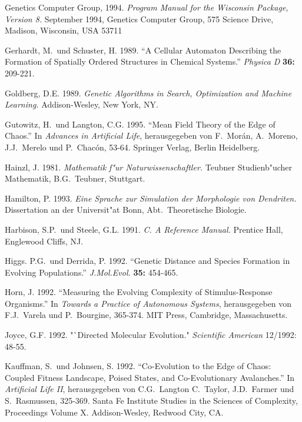 \begin{thebibliography}{99}
Genetics Computer Group, 1994. \textsl{Program Manual for the Wisconsin Package,
            Version 8.} September 1994, Genetics Computer Group,
             575 Science Drive, Madison, Wisconsin, USA  53711

Gerhardt, M.\ und Schuster, H. 1989. "`A Cellular Automaton Describing the Formation of Spatially
Ordered Structures in Chemical Systems."' \textsl{Physica D} \textbf{36:} 209-221.

Goldberg, D.E. 1989. \textsl{Genetic Algorithms in Search, Optimization and Machine Learning.}
Addison-Wesley, New York, NY.

Gutowitz, H.\ und Langton, C.G. 1995. "`Mean Field Theory of the Edge of Chaos."'
In \textsl{Advances in Artificial Life}, herausgegeben von F.\ Mor{\'a}n, A.\ Moreno,
J.J.\ Merelo und P.\ Chac{\'o}n, 53-64. Springer Verlag, Berlin Heidelberg.

Hainzl, J. 1981. \textsl{Mathematik f"ur Naturwissenschaftler.} Teubner Studienb"ucher
Mathematik, B.G.\ Teubner, Stuttgart.

Hamilton, P. 1993. \textsl{Eine Sprache zur Simulation der Morphologie von Dendriten.} Dissertation
an der Universit"at Bonn, Abt.\ Theoretische Biologie.

Harbison, S.P.\ und Steele, G.L. 1991. \textsl{C. A Reference Manual.}
Prentice Hall, Englewood Cliffs, NJ.

Higgs. P.G.\ und Derrida, P. 1992. "`Genetic Distance and Species Formation
in Evolving Populations."' \textsl{J.Mol.Evol.} \textbf{35:} 454-465.


Horn, J. 1992. "`Measuring the Evolving Complexity of Stimulus-Response Organisms."'
In \textsl{Towards a Practice of Autonomous Systems}, herausgegeben von
F.J.\ Varela und P.\ Bourgine, 365-374. MIT Press, Cambridge, Massachusetts.

Joyce, G.F. 1992. "`Directed Molecular Evolution." \textsl{Scientific American} 12/1992: 48-55.

 Kauffman, S.\ und Johnsen, S. 1992. "`Co-Evolution to the Edge of Chaos:
Coupled Fitness Landscape, Poised States, and Co-Evolutionary Avalanches."'
In \textsl{Artificial Life II}, herausgegeben von C.G.\ Langton 
C.\ Taylor, J.D.\ Farmer und S.\ Rasmussen, 325-369. Santa Fe
Institute Studies in the Sciences of Complexity, Proceedings Volume X.
Addison-Wesley, Redwood City, CA.


\end{thebibliography}
